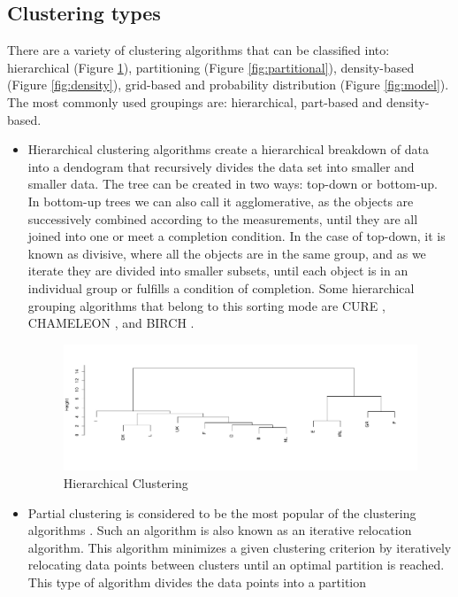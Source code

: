 \subsection*{Clustering types}

There are a variety of clustering algorithms that can be classified into: hierarchical (Figure \ref{fig:hierarchical}), partitioning (Figure \ref{fig:partitional}), density-based (Figure \ref{fig:density}), grid-based and probability distribution (Figure \ref{fig:model}). The most commonly used groupings are: hierarchical, part-based and density-based.
\\
\begin{itemize}
  \item Hierarchical clustering algorithms \cite{b19} create a hierarchical breakdown of data into a dendogram that recursively divides the data set into smaller and smaller data. The tree can be created in two ways: top-down or bottom-up. In bottom-up trees we can also call it agglomerative, as the objects are successively combined according to the measurements, until they are all joined into one or meet a completion condition.  In the case of top-down, it is known as divisive, where all the objects are in the same group, and as we iterate they are divided into smaller subsets, until each object is in an individual group or fulfills a condition of completion.
Some hierarchical grouping algorithms that belong to this sorting mode are CURE \cite{b20}, CHAMELEON \cite{b21}, and BIRCH \cite{b22}.
\begin{figure}[htbp]
  \centering
   \includegraphics[width=14cm]{img/hierarchical}
    \caption{Hierarchical Clustering}
    \label{fig:hierarchical}%
\end{figure}
  \item Partial clustering is considered to be the most popular of the clustering algorithms \cite{b23}. Such an algorithm is also known as an iterative relocation algorithm. This algorithm minimizes a given clustering criterion by iteratively relocating data points between clusters until an optimal partition is reached. This type of algorithm divides the data points into a partition

\end{itemize}
